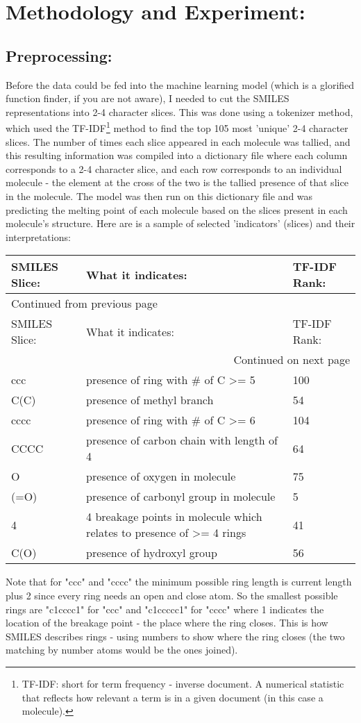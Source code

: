 \documentclass[11pt]{article}
\begin{document}
\section{Methodology and Experiment:}
\label{sec:org15bcca0}
\subsection{Preprocessing:}
\label{sec:org166dfd8}
Before the data could be fed into the machine learning model (which is a glorified function finder, if you are not aware), I needed
to cut the SMILES representations into 2-4 character slices. This was done using a tokenizer method, which used the TF-IDF\footnote{TF-IDF: short for term frequency - inverse document. A numerical statistic that reflects how relevant a term is in a given document (in this case a molecule).} method to find the top 105 most 'unique' 2-4 character slices. 
The number of times each slice appeared in each molecule was tallied, and this resulting information was compiled into a dictionary file 
where each column corresponds to a 2-4 character slice, and each row corresponds to an individual molecule - the element at the cross of the two is the tallied presence of that 
slice in the molecule. The model was then run on this dictionary file and was predicting the melting point of each molecule based on the slices
present in each molecule's structure. 
Here are is a sample of selected 'indicators' (slices) and their interpretations:
\begin{longtable}{|l|p{10cm}|l|}
\hline
SMILES Slice: & What it indicates: & TF-IDF Rank:\\
\hline
\endfirsthead
\multicolumn{3}{l}{Continued from previous page} \\
\hline

SMILES Slice: & What it indicates: & TF-IDF Rank: \\

\hline
\endhead
\hline\multicolumn{3}{r}{Continued on next page} \\
\endfoot
\endlastfoot
\hline
ccc & presence of ring with \# of C >= 5 & 100\\
C(C) & presence of methyl branch & 54\\
cccc & presence of ring with \# of C >= 6 & 104\\
CCCC & presence of carbon chain with length of 4 & 64\\
O & presence of oxygen in molecule & 75\\
(=O) & presence of carbonyl group in molecule & 5\\
4 & 4 breakage points in molecule which relates to presence of >= 4 rings & 41\\
C(O) & presence of hydroxyl group & 56\\
\hline
\end{longtable}
Note that for "ccc" and "cccc" the minimum possible ring length is current length plus 2 since every ring needs an open and close atom. So the smallest possible
rings are "c1cccc1" for "ccc" and "c1ccccc1" for "cccc" where 1 indicates the location of the breakage point - the place where the ring closes. This is how SMILES describes rings - using numbers to show where the ring closes (the two matching by number atoms would be the ones joined).
\end{document}

